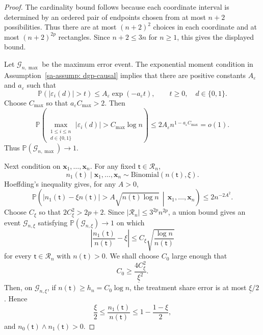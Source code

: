 \documentclass[10pt]{article}
\def\nodet{\mathsf{t}}
\def\bx{\mathbf{x}}
\def\P{\mathbb{P}}
\theoremstyle{definition}
\theoremstyle{remark}
\begin{document}
\begin{proof}
The cardinality bound follows because each coordinate interval is determined by an ordered pair of endpoints chosen from at most $n+2$ possibilities. Thus there are at most $(n+2)^2$ choices in each coordinate and at most $(n+2)^{2p}$ rectangles. Since $n+2\leq 3n$ for $n\geq1$, this gives the displayed bound.

Let $\mathcal G_{n,\max}$ be the maximum error event. The exponential moment
condition in Assumption~\ref{sa-assump: dgp-causal} implies that there are
positive constants $A_{\varepsilon}$ and $a_{\varepsilon}$ such that
\[
    \P(|\varepsilon_i(d)|>t)
    \leq
    A_{\varepsilon}\exp(-a_{\varepsilon}t),
    \qquad t\geq0,\quad d\in\{0,1\}.
\]
Choose $C_{\max}$ so that $a_{\varepsilon}C_{\max}>2$. Then
\[
    \P\left(
        \max_{\substack{1\leq i\leq n\\ d\in\{0,1\}}}
        |\varepsilon_i(d)|>C_{\max}\log n
    \right)
    \leq
    2A_{\varepsilon}n^{1-a_{\varepsilon}C_{\max}}
    =
    o(1).
\]
Thus $\P(\mathcal G_{n,\max})\to1$.

Next condition on $\bx_1,\ldots,\bx_n$. For any fixed $\nodet\in\mathcal R_n$,
\[
    n_1(\nodet)\mid \bx_1,\ldots,\bx_n
    \sim
    \mathrm{Binomial}(n(\nodet),\xi).
\]
Hoeffding's inequality gives, for any $A>0$,
\[
    \P\left(
        |n_1(\nodet)-\xi n(\nodet)|
        >
        A\sqrt{n(\nodet)\log n}
        \,\middle|\,
        \bx_1,\ldots,\bx_n
    \right)
    \leq
    2n^{-2A^2}.
\]
Choose $C_{\xi}$ so that $2C_{\xi}^2>2p+2$. Since
$|\mathcal R_n|\leq 3^{2p}n^{2p}$, a union bound gives an event
$\mathcal G_{n,\xi}$ satisfying $\P(\mathcal G_{n,\xi})\to1$ on which
\[
    \left|
        \frac{n_1(\nodet)}{n(\nodet)}-\xi
    \right|
    \leq
    C_{\xi}\sqrt{\frac{\log n}{n(\nodet)}}
\]
for every $\nodet\in\mathcal R_n$ with $n(\nodet)>0$. We shall choose
$C_0$ large enough that
\[
    C_0\geq \frac{4C_{\xi}^2}{\underline\xi^2}.
\]
Then, on $\mathcal G_{n,\xi}$, if $n(\nodet)\geq h_n=C_0\log n$, the treatment
share error is at most $\underline\xi/2$. Hence
\[
    \frac{\xi}{2}
    \leq
    \frac{n_1(\nodet)}{n(\nodet)}
    \leq
    1-\frac{1-\xi}{2},
\]
and $n_0(\nodet)\wedge n_1(\nodet)>0$.


\end{proof}
\end{document}
